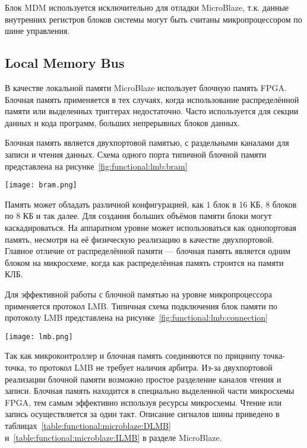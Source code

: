 Блок MDM используется исключительно для отладки MicroBlaze, т.к. данные внутренних регистров
блоков системы могут быть считаны микропроцессором по шине управления.

\subsection{Local Memory Bus}
\label{sec:functional:lmb}

В качестве локальной памяти MicroBlaze использует блочную память FPGA.
Блочная память применяется в тех случаях, когда использование распределённой памяти
или выделенных триггерах недостаточно. Часто используется для секции данных и кода программ,
больших непрерывных блоков данных.

Блочная память является двухпортовой памятью, с раздельными каналами для записи и чтения
данных. Схема одного порта типичной блочной памяти представлена
на рисунке~\ref{fig:functional:lmb:bram}

\begin{center}
  \centering
  \texttt{[image: bram.png]}
  \label{fig:functional:lmb:bram}
\end{center}

Память может обладать различной конфигурацией, как 1 блок в 16 КБ, 8 блоков по 8 КБ и так далее.
Для создания больших объёмов памяти блоки могут каскадироваться. На аппаратном уровне может использоваться
как однопортовая память, несмотря на её физическую реализацию в качестве двухпортовой. Главное отличие от
распределённой памяти --- блочная память является одним блоком на микросхеме, когда как распределённая
память строится на памяти КЛБ.

Для эффективной работы с блочной памятью на уровне микропроцессора применяется протокол LMB.
Типичная схема подключения блок памяти по протоколу LMB представлена на рисунке~\ref{fig:functional:lmb:connection}

\begin{center}
  \centering
  \texttt{[image: lmb.png]}
  \label{fig:functional:lmb:connection}
\end{center}

Так как микроконтроллер и блочная память соединяются по прицнипу точка-точка, то протокол LMB
не требует наличия арбитра. Из-за двухпортовой реализации блочной памяти возможно простое разделение
каналов чтения и записи. Блочная память находится в специально выделенной части микросхемы FPGA,
тем самым эффективно используя ресурсы микросхемы. Чтение или запись осуществляется за один такт.
Описание сигналов шины приведено в таблицах~\ref{table:functional:microblaze:DLMB} и~\ref{table:functional:microblaze:ILMB} в
разделе MicroBlaze.

